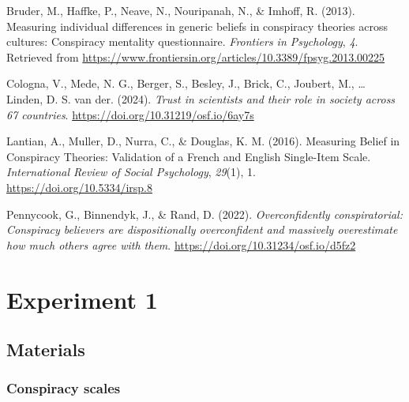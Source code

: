 \documentclass[
  doc,floatsintext]{apa6}
\newlength{\cslhangindent}
\newlength{\cslentryspacingunit} %
\newenvironment{CSLReferences}[2] %
 {%
  \setlength{\parindent}{0pt}
  \ifodd #1
  \let\oldpar\par
  \def\par{\hangindent=\cslhangindent\oldpar}
  \fi
  \setlength{\parskip}{#2\cslentryspacingunit}
 }%
 {}
\begin{document}
\hypertarget{refs}{}
\begin{CSLReferences}{1}{0}
\leavevmode{}%
Bruder, M., Haffke, P., Neave, N., Nouripanah, N., \& Imhoff, R. (2013). Measuring individual differences in generic beliefs in conspiracy theories across cultures: Conspiracy mentality questionnaire. \emph{Frontiers in Psychology}, \emph{4}. Retrieved from \url{https://www.frontiersin.org/articles/10.3389/fpsyg.2013.00225}

\leavevmode{}%
Cologna, V., Mede, N. G., Berger, S., Besley, J., Brick, C., Joubert, M., \ldots{} Linden, D. S. van der. (2024). \emph{Trust in scientists and their role in society across 67 countries}. \url{https://doi.org/10.31219/osf.io/6ay7s}

\leavevmode{}%
Lantian, A., Muller, D., Nurra, C., \& Douglas, K. M. (2016). Measuring Belief in Conspiracy Theories: Validation of a French and English Single-Item Scale. \emph{International Review of Social Psychology}, \emph{29}(1), 1. \url{https://doi.org/10.5334/irsp.8}

\leavevmode{}%
Pennycook, G., Binnendyk, J., \& Rand, D. (2022). \emph{Overconfidently conspiratorial: Conspiracy believers are dispositionally overconfident and massively overestimate how much others agree with them}. \url{https://doi.org/10.31234/osf.io/d5fz2}

\end{CSLReferences}

\newpage

\hypertarget{appendix-appendix}{%
\appendix}


\hypertarget{exp1}{%
\section{Experiment 1}\label{exp1}}

\hypertarget{materials-1}{%
\subsection{Materials}\label{materials-1}}

\FloatBarrier

\hypertarget{conspiracy-scales-1}{%
\subsubsection{Conspiracy scales}\label{conspiracy-scales-1}}
\end{document}

